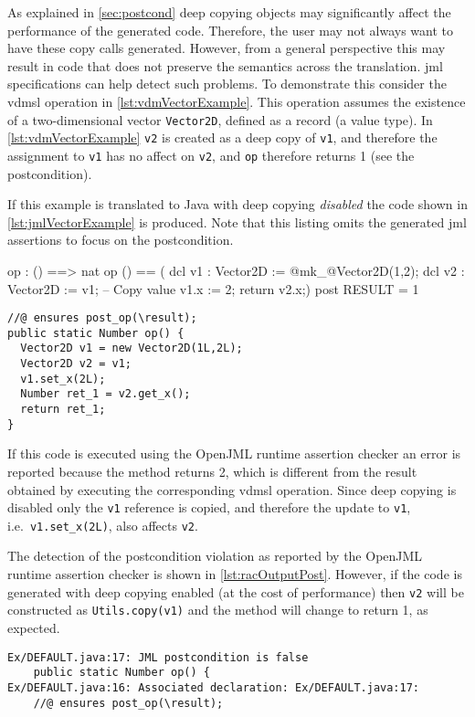 As explained in \autoref{sec:postcond} deep copying objects may
significantly affect the performance of the generated code. Therefore,
the user may not always want to have these copy calls
generated. However, from a general perspective this may result in code
that does not preserve the semantics across the translation. \ac{jml}
specifications can help detect such problems. To demonstrate this
consider the \ac{vdmsl} operation in
\autoref{lst:vdmVectorExample}. This operation assumes the existence
of a two-dimensional vector \texttt{Vector2D}, defined as a record (a
value type). In \autoref{lst:vdmVectorExample} \texttt{v2} is created
as a deep copy of \texttt{v1}, and therefore the assignment to
\texttt{v1} has no affect on \texttt{v2}, and \texttt{op} therefore
returns 1 (see the postcondition).

If this example is translated to Java with deep copying
\emph{disabled} the code shown in \autoref{lst:jmlVectorExample} is
produced. Note that this listing omits the generated \ac{jml}
assertions to focus on the postcondition.

\begin{vdmsl}[style=customVdm,caption={Use of value types in
\ac{vdm}.},label={lst:vdmVectorExample}]
op : () ==> nat
op () == (
dcl v1 : Vector2D := @mk_@Vector2D(1,2);
dcl v2 : Vector2D := v1; -- Copy value
v1.x := 2;
return v2.x;)
post RESULT = 1
\end{vdmsl}

\begin{lstlisting}[style=customJml,caption={Generated Java code
without copy calls.},label={lst:jmlVectorExample}]
//@ ensures post_op(\result);
public static Number op() {
  Vector2D v1 = new Vector2D(1L,2L);
  Vector2D v2 = v1;
  v1.set_x(2L);
  Number ret_1 = v2.get_x();
  return ret_1;
}
\end{lstlisting}

If this code is executed using the OpenJML runtime assertion checker
an error is reported because the method returns 2, which is different
from the result obtained by executing the corresponding \ac{vdmsl}
operation. Since deep copying is disabled only the \texttt{v1}
reference is copied, and therefore the update to \texttt{v1}, i.e.\
\texttt{v1.set\_x(2L)}, also affects \texttt{v2}.

The detection of the postcondition violation as reported by the
OpenJML runtime assertion checker is shown in
\autoref{lst:racOutputPost}. However, if the code is generated with
deep copying enabled (at the cost of performance) then \texttt{v2}
will be constructed as \texttt{Utils.copy(v1)} and the method will
change to return 1, as expected.

\begin{lstlisting}[style=racOutput,caption={Detection of a
postcondition violation.},label={lst:racOutputPost}]
Ex/DEFAULT.java:17: JML postcondition is false
    public static Number op() {
Ex/DEFAULT.java:16: Associated declaration: Ex/DEFAULT.java:17: 
    //@ ensures post_op(\result);
\end{lstlisting}


